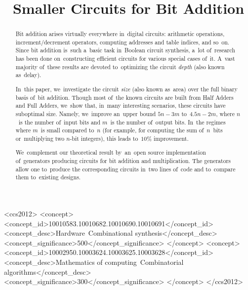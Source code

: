 \documentclass[sigconf, review, anonymous]{acmart}
\begin{document}
\begin{CCSXML}
	<ccs2012>
	<concept>
	<concept_id>10010583.10010682.10010690.10010691</concept_id>
	<concept_desc>Hardware~Combinational synthesis</concept_desc>
	<concept_significance>500</concept_significance>
	</concept>
	<concept>
	<concept_id>10002950.10003624.10003625.10003628</concept_id>
	<concept_desc>Mathematics of computing~Combinatorial algorithms</concept_desc>
	<concept_significance>300</concept_significance>
	</concept>
	</ccs2012>
\end{CCSXML}



\title{Smaller Circuits for Bit Addition}

\begin{abstract}
    Bit addition arises virtually everywhere in~digital circuits:
    arithmetic operations,
    increment/decrement operators,
    computing addresses and table indices, and so~on.
    Since bit addition is~such a~basic task in~Boolean circuit synthesis,
    a~lot of~research has been done on~constructing efficient circuits
    for various special cases of~it. A~vast majority of~these results are devoted to~optimizing the circuit \emph{depth} (also known as~delay).

    In~this paper, we~investigate the circuit \emph{size} (also known as~area)
    over the full binary basis of~bit addition. Though most of~the known circuits are built from Half Adders and Full Adders,
    we~show that, in~many interesting scenarios, these circuits have suboptimal size.
    Namely, we~improve an~upper bound $5n-3m$ to~$4.5n-2m$,
    where $n$~is the number of~input bits and $m$~is the number of~output bits.
    In~the regimes where $m$~is small compared to~$n$ 
    (for example, for computing the sum 
    of~$n$~bits or~multiplying two $n$-bit integers),
    this leads to~$10\%$ improvement.

    We~complement our theoretical result by~an~open source implementation
    of~generators producing circuits for bit addition and multiplication.
    The generators allow one to~produce the corresponding circuits
    in~two lines of~code and to~compare them to~existing designs.
\end{abstract}
\end{document}
